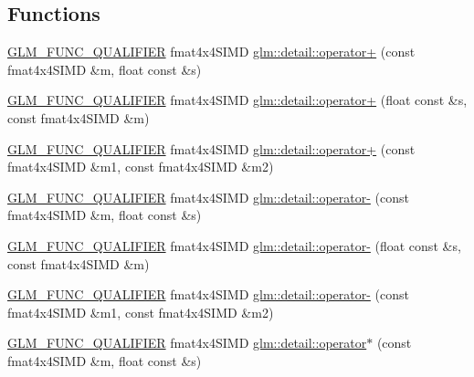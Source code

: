 \subsection*{Functions}
\begin{DoxyCompactItemize}
\item 
\hyperlink{setup_8hpp_a33fdea6f91c5f834105f7415e2a64407}{G\+L\+M\+\_\+\+F\+U\+N\+C\+\_\+\+Q\+U\+A\+L\+I\+F\+I\+ER} fmat4x4\+S\+I\+MD \hyperlink{namespaceglm_1_1detail_a629935a47dc01b2cd4aa5598f364e359}{glm\+::detail\+::operator+} (const fmat4x4\+S\+I\+MD \&m, float const \&s)
\item 
\hyperlink{setup_8hpp_a33fdea6f91c5f834105f7415e2a64407}{G\+L\+M\+\_\+\+F\+U\+N\+C\+\_\+\+Q\+U\+A\+L\+I\+F\+I\+ER} fmat4x4\+S\+I\+MD \hyperlink{namespaceglm_1_1detail_a4b632f8b13f05642eea7d551815f0923}{glm\+::detail\+::operator+} (float const \&s, const fmat4x4\+S\+I\+MD \&m)
\item 
\hyperlink{setup_8hpp_a33fdea6f91c5f834105f7415e2a64407}{G\+L\+M\+\_\+\+F\+U\+N\+C\+\_\+\+Q\+U\+A\+L\+I\+F\+I\+ER} fmat4x4\+S\+I\+MD \hyperlink{namespaceglm_1_1detail_a9f20d29252cc62031ba3b05aff1d2fe8}{glm\+::detail\+::operator+} (const fmat4x4\+S\+I\+MD \&m1, const fmat4x4\+S\+I\+MD \&m2)
\item 
\hyperlink{setup_8hpp_a33fdea6f91c5f834105f7415e2a64407}{G\+L\+M\+\_\+\+F\+U\+N\+C\+\_\+\+Q\+U\+A\+L\+I\+F\+I\+ER} fmat4x4\+S\+I\+MD \hyperlink{namespaceglm_1_1detail_aab9939909f4d23c042e7d438dda5caca}{glm\+::detail\+::operator-\/} (const fmat4x4\+S\+I\+MD \&m, float const \&s)
\item 
\hyperlink{setup_8hpp_a33fdea6f91c5f834105f7415e2a64407}{G\+L\+M\+\_\+\+F\+U\+N\+C\+\_\+\+Q\+U\+A\+L\+I\+F\+I\+ER} fmat4x4\+S\+I\+MD \hyperlink{namespaceglm_1_1detail_a470e32d5d0337f7714ecb8c8c9ad368d}{glm\+::detail\+::operator-\/} (float const \&s, const fmat4x4\+S\+I\+MD \&m)
\item 
\hyperlink{setup_8hpp_a33fdea6f91c5f834105f7415e2a64407}{G\+L\+M\+\_\+\+F\+U\+N\+C\+\_\+\+Q\+U\+A\+L\+I\+F\+I\+ER} fmat4x4\+S\+I\+MD \hyperlink{namespaceglm_1_1detail_a00972f91f088e7ab0f96ebdc6e8bec41}{glm\+::detail\+::operator-\/} (const fmat4x4\+S\+I\+MD \&m1, const fmat4x4\+S\+I\+MD \&m2)
\item 
\hyperlink{setup_8hpp_a33fdea6f91c5f834105f7415e2a64407}{G\+L\+M\+\_\+\+F\+U\+N\+C\+\_\+\+Q\+U\+A\+L\+I\+F\+I\+ER} fmat4x4\+S\+I\+MD \hyperlink{namespaceglm_1_1detail_a56fc3932025be61fb9a7cb14005c0d00}{glm\+::detail\+::operator$\ast$} (const fmat4x4\+S\+I\+MD \&m, float const \&s)
\item 

\end{DoxyCompactItemize}

